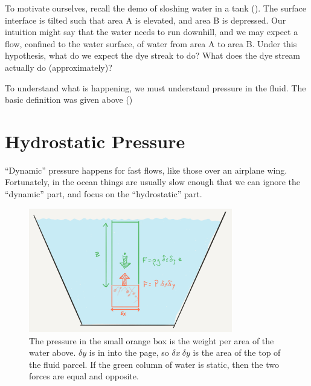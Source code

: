 To motivate ourselves, recall the demo of sloshing water in a tank ().  The surface interface is tilted such that area A is elevated, and area B is depressed.  Our intuition might say that the water needs to run downhill, and we may expect a flow, confined to the water surface, of water from area A to area B. Under this hypothesis, what do we expect the dye streak to do?  What does the dye stream actually do (approximately)?

To understand what is happening, we must understand pressure in the fluid.  The basic definition was given above ()


\section{Hydrostatic Pressure}

``Dynamic'' pressure happens for fast flows, like those over an
airplane wing.  Fortunately, in the ocean things are usually slow
enough that we can ignore the ``dynamic'' part, and focus on the
``hydrostatic'' part.

\begin{figure}[htbp]
\includegraphics[width=3.5in]{figs/OneDens.png}
\caption{The pressure in the small orange box is  the weight per area of the water above.  $\delta y $ is in into the page, so $\delta x\ \delta y$ is the area of the top of the fluid parcel.  If the green column of water is static, then the two forces are equal and opposite.  }
\label{fig:OneDens}
\end{figure}


